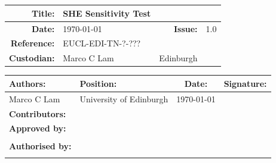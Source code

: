 \documentclass[11pt]{EuclidVIS}
\numberwithin{table}{section}
\numberwithin{figure}{section}
\begin{document}
\color{black}


\section*{}
\vspace{+0.2cm}
\noindent
\begin{tabularx}{1.0\textwidth}{ | r | X | r | l |}
\hline
\textbf{Title:} & SHE Sensitivity Test & & \\
\hline
\textbf{Date:} & \today & \textbf{Issue:} & 1.0 \\
\hline
\textbf{Reference:} & EUCL-EDI-TN-?-??? & & \\
\hline
\textbf{Custodian:} & Marco C Lam & Edinburgh &\\
\hline
\end{tabularx}


\vspace{+4cm}
\noindent
\begin{tabularx}{1.0\textwidth}{ | l | X | c | l |}
\hline
\rowcolor{gray!30}
\textbf{Authors:} & \textbf{Position:} & \textbf{Date:} & \textbf{Signature:}\\
\hline
Marco C Lam & University of Edinburgh & \today & \\
\hline
\rowcolor{gray!30}
\textbf{Contributors:} & & & \\
\hline
\hline
\rowcolor{gray!30}
\textbf{Approved by:} & & &\\
\hline
&&&\\
\hline
\rowcolor{gray!30}
\textbf{Authorised by:} & & &\\
\hline
&&&\\
\hline
\end{tabularx}
\end{document}
